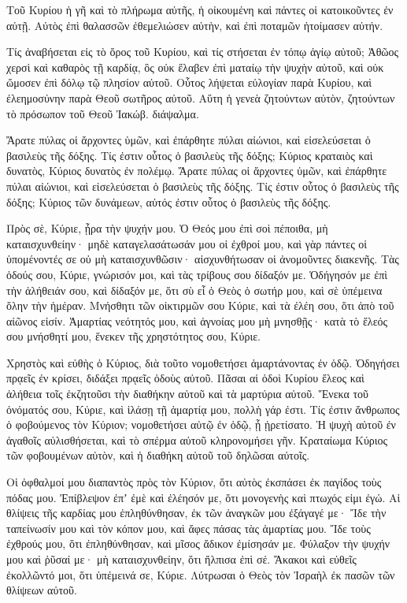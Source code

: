 \begin{spacing}{1.1}
\begin{multicols}{2}
Τοῦ Κυρίου ἡ γῆ καὶ τὸ πλήρωμα αὐτῆς, ἡ οἰκουμένη καὶ πάντες οἱ κατοικοῦντες ἐν αὐτῇ.
Αὐτὸς ἐπὶ θαλασσῶν ἐθεμελιώσεν αὐτὴν, καὶ ἐπὶ ποταμῶν ἡτοίμασεν αὐτήν.

Τίς ἀναβήσεται εἰς τὸ ὄρος τοῦ Κυρίου, καὶ τίς στήσεται ἐν τόπῳ ἁγίῳ αὐτοῦ;
Ἀθῶος χερσὶ καὶ καθαρὸς τῇ καρδίᾳ, ὃς οὐκ ἔλαβεν ἐπὶ ματαίῳ τὴν ψυχὴν αὐτοῦ, καὶ οὐκ ὤμοσεν ἐπὶ δόλῳ τῷ πλησίον αὐτοῦ.
Οὗτος λήψεται εὐλογίαν παρὰ Κυρίου, καὶ ἐλεημοσύνην παρὰ Θεοῦ σωτῆρος αὐτοῦ.
Αὕτη ἡ γενεὰ ζητούντων αὐτὸν, ζητούντων τὸ πρόσωπον τοῦ Θεοῦ Ἰακώβ. διάψαλμα.

Ἄρατε πύλας οἱ ἄρχοντες ὑμῶν, καὶ ἐπάρθητε πύλαι αἰώνιοι, καὶ εἰσελεύσεται ὁ βασιλεὺς τῆς δόξης.
Τίς ἐστιν οὗτος ὁ βασιλεὺς τῆς δόξης; Κύριος κραταιὸς καὶ δυνατὸς, Κύριος δυνατὸς ἐν πολέμῳ.
Ἄρατε πύλας οἱ ἄρχοντες ὑμῶν, καὶ ἐπάρθητε πύλαι αἰώνιοι, καὶ εἰσελεύσεται ὁ βασιλεὺς τῆς δόξης.
Τίς ἐστιν οὗτος ὁ βασιλεὺς τῆς δόξης; Κύριος τῶν δυνάμεων, αὐτός ἐστιν οὗτος ὁ βασιλεὺς τῆς δόξης.

Πρὸς σὲ, Κύριε, ᾖρα τὴν ψυχήν μου.
Ὁ Θεός μου ἐπὶ σοὶ πέποιθα, μὴ καταισχυνθείην· μηδὲ καταγελασάτωσάν μου οἱ ἐχθροί μου,
καὶ γὰρ πάντες οἱ ὑπομένοντές σε οὐ μὴ καταισχυνθῶσιν· αἰσχυνθήτωσαν οἱ ἀνομοῦντες διακενῆς.
Τὰς ὁδούς σου, Κύριε, γνώρισόν μοι, καὶ τὰς τρίβους σου δίδαξόν με.
Ὁδήγησόν με ἐπὶ τὴν ἀλήθειάν σου, καὶ δίδαξόν με, ὅτι σὺ εἶ ὁ Θεὸς ὁ σωτήρ μου, καὶ σὲ ὑπέμεινα ὅλην τὴν ἡμέραν.
Μνήσθητι τῶν οἰκτιρμῶν σου Κύριε, καὶ τὰ ἐλέη σου, ὅτι ἀπὸ τοῦ αἰῶνος εἰσίν.
Ἁμαρτίας νεότητός μου, καὶ ἀγνοίας μου μὴ μνησθῇς· κατὰ τὸ ἔλεός σου μνήσθητί μου, ἕνεκεν τῆς χρηστότητος σου, Κύριε.

Χρηστὸς καὶ εὐθὴς ὁ Κύριος, διὰ τοῦτο νομοθετήσει ἁμαρτάνοντας ἐν ὁδῷ.
Ὁδηγήσει πρᾳεῖς ἐν κρίσει, διδάξει πρᾳεῖς ὁδοὺς αὐτοῦ.
Πᾶσαι αἱ ὁδοὶ Κυρίου ἔλεος καὶ ἀλήθεια τοῖς ἐκζητοῦσι τὴν διαθήκην αὐτοῦ καὶ τὰ μαρτύρια αὐτοῦ.
Ἕνεκα τοῦ ὀνόματός σου, Κύριε, καὶ ἱλάσῃ τῇ ἁμαρτίᾳ μου, πολλὴ γάρ ἐστι.
Τίς ἐστιν ἄνθρωπος ὁ φοβούμενος τὸν Κύριον; νομοθετήσει αὐτῷ ἐν ὁδῷ, ᾗ ᾑρετίσατο.
Ἡ ψυχὴ αὐτοῦ ἐν ἀγαθοῖς αὐλισθήσεται, καὶ τὸ σπέρμα αὐτοῦ κληρονομήσει γῆν.
Κραταίωμα Κύριος τῶν φοβουμένων αὐτὸν, καὶ ἡ διαθήκη αὐτοῦ τοῦ δηλῶσαι αὐτοῖς.

Οἱ ὀφθαλμοί μου διαπαντὸς πρὸς τὸν Κύριον, ὅτι αὐτὸς ἐκσπάσει ἐκ παγίδος τοὺς πόδας μου.
Ἐπίβλεψον ἐπʼ ἐμὲ καὶ ἐλέησόν με, ὅτι μονογενὴς καὶ πτωχός εἰμι ἐγώ.
Αἱ θλίψεις τῆς καρδίας μου ἐπληθύνθησαν, ἐκ τῶν ἀναγκῶν μου ἐξάγαγέ με·
Ἴδε τὴν ταπείνωσίν μου καὶ τὸν κόπον μου, καὶ ἄφες πάσας τὰς ἁμαρτίας μου.
Ἴδε τοὺς ἐχθρούς μου, ὅτι ἐπληθύνθησαν, καὶ μῖσος ἄδικον ἐμίσησάν με.
Φύλαξον τὴν ψυχήν μου καὶ ῥῦσαί με· μὴ καταισχυνθείην, ὅτι ἤλπισα ἐπὶ σέ.
Ἄκακοι καὶ εὐθεῖς ἐκολλῶντό μοι, ὅτι ὑπέμεινά σε, Κύριε.
Λύτρωσαι ὁ Θεὸς τὸν Ἰσραὴλ ἐκ πασῶν τῶν θλίψεων αὐτοῦ.


\end{multicols}
\end{spacing}
